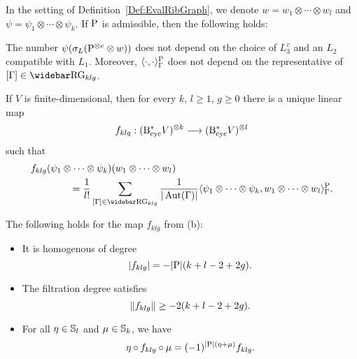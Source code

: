 \documentclass[\MainFolder/Text.tex]{subfiles}
\begin{document}
\begin{Proposition}\label{Prop:GraphPairing}
In the setting of Definition~\ref{Def:EvalRibGraph}, we denote $w = w_1 \otimes \dotsb \otimes w_l$ and $\psi = \psi_1 \otimes \dotsb\otimes \psi_k$. If $\mathrm{P}$ is admissible, then the following holds:
\begin{ClaimList}
\item The number $\psi(\sigma_L(\mathrm{P}^{\otimes e}\otimes w))$ does not depend on the choice of $L_{3}^v$ and an $L_2$ compatible with $L_1$. Moreover, $\langle\cdot, \cdot \rangle_\Gamma^{\mathrm{P}}$ does not depend on the representative of $[\Gamma]\in \RRG_{klg}$.
\item If $V$ is finite-dimensional, then for every $k$, $l \ge 1$, $g \ge 0$ there is a unique linear map
\[ f_{klg}: (\mathrm{B}_{\mathrm{cyc}}^* V)^{\otimes k} \longrightarrow (\mathrm{B}_{\mathrm{cyc}}^* V)^{\otimes l} \] such that
\begin{equation*}
\begin{aligned}
&f_{klg}(\psi_1\otimes \dotsb \otimes \psi_k)(w_1 \otimes \dotsb \otimes w_l) \\
 &\qquad\qquad =  \frac{1}{l!} \sum_{[\Gamma]\in \RRG_{klg}} \frac{1}{\Abs{\Aut(\Gamma)}} \langle \psi_1\otimes \dotsb \otimes \psi_k, w_1 \otimes \dotsb \otimes w_l\rangle^{\Prpg}_{\Gamma}. \end{aligned}
\end{equation*}
\item The following holds for the map $f_{klg}$ from (b):
\begin{itemize}
\item It is homogenous of degree
\begin{equation} \label{Eq:DegreeForm} |f_{klg}| = -|\mathrm{P}|(k+l-2+2g). \end{equation}
\item The filtration degree satisfies
\begin{equation} \label{Eq:FiltrDegreeForm} 
 \| f_{klg} \| \ge - 2 (k+l-2+2g).
\end{equation}
\item For all $\eta\in\mathbb{S}_l$ and $\mu\in\mathbb{S}_k$, we have
\begin{equation} \label{Eq:SymmetryForm} \eta \circ f_{klg} \circ \mu = (-1)^{|\mathrm{P}|(\eta + \mu)}f_{klg}.
\end{equation}
\end{itemize}
\end{ClaimList}
\end{Proposition}
\end{document}
